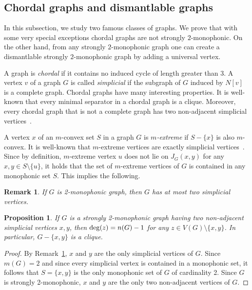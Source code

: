 \documentclass[a4paper,11pt]{article}
\newtheorem{proposition}[theorem]{Proposition}
\newtheorem{remark}[theorem]{Remark}
\begin{document}
\subsection{Chordal graphs and dismantlable graphs}
\label{ss:chordal}
In this subsection, we study two famous classes of graphs. We prove that with some very special exceptions chordal graphs are not strongly $2$-monophonic. On the other hand, from any strongly $2$-monophonic graph one can create a dismantlable strongly $2$-monophonic graph by adding a universal vertex. 

A graph is \emph{chordal} if it contains no induced cycle of length greater than 3. A vertex $v$ of a graph $G$ is called \emph{simplicial} if the subgraph of $G$ induced by $N[v]$ is a complete graph. Chordal graphs have many interesting properties. It is well-known that every minimal separator in a chordal graph is a clique. Moreover, every chordal graph that is not a complete graph has two non-adjacent simplicial vertices~\cite{dirac1961rigid}.

A vertex $x$ of an $m$-convex set $S$ in a graph $G$ is {\em $m$-extreme} if $S-\{x\}$ is also $m$-convex.  It is well-known that $m$-extreme vertices are exactly simplicial vertices~\cite{FJ}. Since by definition, $m$-extreme vertex $u$ does not lie on $J_G(x,y)$ for any $x,y \in S\setminus \{u\}$, it holds that the set of $m$-extreme vertices of $G$ is contained in any monophonic set $S$. This implies the following.

\begin{remark}\label{rem:2-monophonic}
    If $G$ is 2-monophonic graph, then $G$ has at most two simplicial vertices.
\end{remark}

 

\begin{proposition}\label{prp:S2M-1}
    If $G$ is a strongly 2-monophonic graph having two non-adjacent simplicial vertices $x,y$, then ${\rm{deg}}(z)=n(G)-1$ for any $z \in V(G)\setminus \{x,y\}$. In particular, $G-\{x,y\}$ is a clique.
\end{proposition}

\begin{proof}
    By Remark~\ref{rem:2-monophonic}, $x$ and $y$ are the only simplicial vertices of $G$. Since $m(G)=2$ and since every simplicial vertex is contained in a monophonic set, it follows that $S=\{x,y\}$ is the only monophonic set of $G$ of cardinality 2. Since $G$ is strongly 2-monophonic, $x$ and $y$ are the only two non-adjacent vertices of $G$. 
\end{proof}
\end{document}
